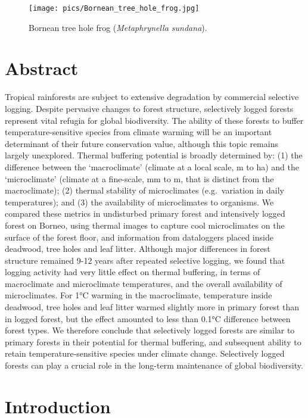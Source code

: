 \documentclass[12pt,a4paper,]{report}
\theoremstyle{definition}
\theoremstyle{definition}
\theoremstyle{definition}
\theoremstyle{remark}
\begin{document}
\begin{figure}[!htb]
\centering
\texttt{[image: pics/Bornean\_tree\_hole\_frog.jpg]}
\caption*{Bornean tree hole frog (\textit{Metaphrynella sundana}).}
\end{figure}

\pagebreak

\section{Abstract}\label{abstract-2}

Tropical rainforests are subject to extensive degradation by commercial
selective logging. Despite pervasive changes to forest structure,
selectively logged forests represent vital refugia for global
biodiversity. The ability of these forests to buffer
temperature-sensitive species from climate warming will be an important
determinant of their future conservation value, although this topic
remains largely unexplored. Thermal buffering potential is broadly
determined by: (1) the difference between the `macroclimate' (climate at
a local scale, m to ha) and the `microclimate' (climate at a fine-scale,
mm to m, that is distinct from the macroclimate); (2) thermal stability
of microclimates (e.g.~variation in daily temperatures); and (3) the
availability of microclimates to organisms. We compared these metrics in
undisturbed primary forest and intensively logged forest on Borneo,
using thermal images to capture cool microclimates on the surface of the
forest floor, and information from dataloggers placed inside deadwood,
tree holes and leaf litter. Although major differences in forest
structure remained 9-12 years after repeated selective logging, we found
that logging activity had very little effect on thermal buffering, in
terms of macroclimate and microclimate temperatures, and the overall
availability of microclimates. For 1°C warming in the macroclimate,
temperature inside deadwood, tree holes and leaf litter warmed slightly
more in primary forest than in logged forest, but the effect amounted to
less than 0.1°C difference between forest types. We therefore conclude
that selectively logged forests are similar to primary forests in their
potential for thermal buffering, and subsequent ability to retain
temperature-sensitive species under climate change. Selectively logged
forests can play a crucial role in the long-term maintenance of global
biodiversity.

\section{Introduction}\label{introduction-1}
\end{document}
